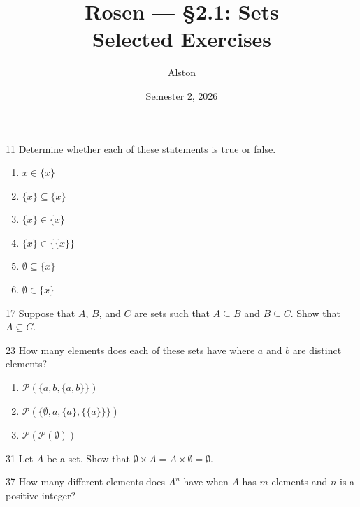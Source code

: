 \documentclass[11pt]{article}
\title{Rosen --- \S 2.1: Sets\\ \large Selected Exercises}
\author{Alston}
\date{Semester 2, 2026}
\begin{document}
\maketitle

\begin{exercise}{11}
    Determine whether each of these statements is true or false.
    \begin{enumerate}[label=(\alph*)]
        \item $x \in \{x\}$
        \item $\{x\} \subseteq \{x\}$
        \item $\{x\} \in \{x\}$
        \item $\{x\} \in \{\{x\}\}$
        \item $\emptyset \subseteq \{x\}$
        \item $\emptyset \in \{x\}$
    \end{enumerate}
\end{exercise}

\begin{exercise}{17}
    Suppose that $A$, $B$, and $C$ are sets such that $A \subseteq B$ and
    $B \subseteq C$. Show that $A \subseteq C$.
\end{exercise}

\begin{exercise}{23}
    How many elements does each of these sets have where $a$ and $b$ are
    distinct elements?
    \begin{enumerate}[label=(\alph*)]
        \item $\mathcal{P}(\{a, b, \{a, b\}\})$
        \item $\mathcal{P}(\{\emptyset, a, \{a\}, \{\{a\}\}\})$
        \item $\mathcal{P}(\mathcal{P}(\emptyset))$
    \end{enumerate}
\end{exercise}

\begin{exercise}{31}
    Let $A$ be a set. Show that $\emptyset \times A = A \times \emptyset
    = \emptyset$.
\end{exercise}

\begin{exercise}{37}
    How many different elements does $A^n$ have when $A$ has $m$
    elements and $n$ is a positive integer?
\end{exercise}
\end{document}
